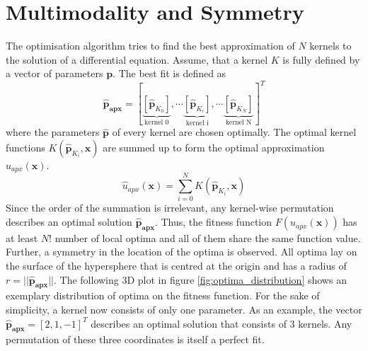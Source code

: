 \documentclass[./\jobname.tex]{subfiles}
\begin{document}
\section{Multimodality and Symmetry}
\label{chap:multimodality_and_symmetry}
The optimisation algorithm tries to find the best approximation of $N$ kernels to the solution of a differential equation. Assume, that a kernel $K$ is fully defined by a vector of parameters $\mathbf{p}$. The best fit is defined as 
\begin{equation}
\mathbf{\hat{p}_{apx}} = \left[\underbrace{\left[ \mathbf{\hat{p}}_{K_0} \right] }_{\text{kernel 0}}, \cdots \underbrace{\left[ \mathbf{\hat{p}}_{K_i} \right] }_{\text{kernel i}}, \cdots \underbrace{\left[ \mathbf{\hat{p}}_{K_N} \right]}_{\text{kernel N}} \right]^T
\end{equation}
where the parameters $\mathbf{\hat{p}}$ of every kernel are chosen optimally. The optimal kernel functions $K(\mathbf{\hat{p}}_{K_i}, \mathbf{x})$ are summed up to form the optimal approximation $\hat{u}_{apx}(\mathbf{x})$. 
\begin{equation}
\label{eq:uapx_kernel_sum}
\hat{u}_{apx}(\mathbf{x}) = \sum_{i=0}^{N} K(\mathbf{\hat{p}}_{K_i}, \mathbf{x})
\end{equation}
Since the order of the summation is irrelevant, any kernel-wise permutation describes an optimal solution $\mathbf{\hat{p}_{apx}}$. Thus, the fitness function $F(u_{apx}(\mathbf{x}))$ has at least $N!$ number of local optima and all of them share the same function value. Further, a symmetry in the location of the optima is observed. All optima lay on the surface of the hypersphere that is centred at the origin and has a radius of $r = || \mathbf{\hat{p}_{apx}} ||$. The following 3D plot in figure \ref{fig:optima_distribution} shows an exemplary distribution of optima on the fitness function. For the sake of simplicity, a kernel now consists of only one parameter. As an example, the vector $\mathbf{\hat{p}_{apx}} = \left[ 2, 1, -1 \right]^T$ describes an optimal solution that consists of 3 kernels. Any permutation of these three coordinates is itself a perfect fit. 
\end{document}

